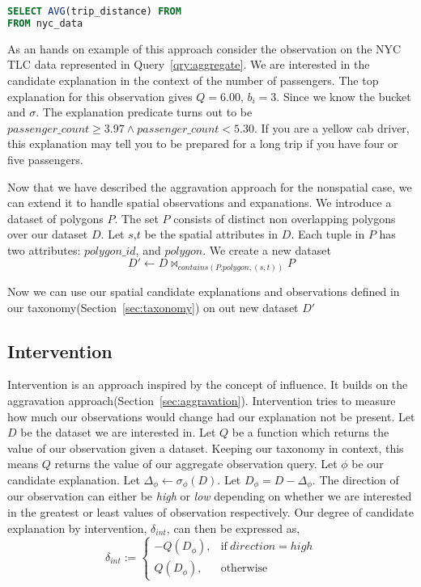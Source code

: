\renewcommand{\lstlistingname}{Query}%
\begin{lstlisting}[language=SQL, caption=Aggregate Query for average tip percentage, label=qry:aggregate]
SELECT AVG(trip_distance) FROM
FROM nyc_data
\end{lstlisting}

As an hands on example of this approach consider the observation on the NYC TLC data represented in Query~\ref{qry:aggregate}. We are interested in the candidate explanation in the context of the number of passengers. The top explanation for this observation gives $Q=6.00$, $b_i=3$. Since we know the bucket and $\sigma$. The explanation predicate turns out to be $passenger\_count \geq 3.97 \wedge passenger\_count < 5.30$. If you are a yellow cab driver, this explanation may tell you to be prepared for a long trip if you have four or five passengers.

Now that we have described the aggravation approach for the nonspatial case, we can extend it to handle spatial observations and expanations. We introduce a dataset of polygons $P$. The set $P$ consists of distinct non overlapping polygons over our dataset $D$. Let $s$,$t$ be the spatial attributes in $D$. Each tuple in $P$ has two attributes: $polygon\_id$, and $polygon$. We create a new dataset 
$$D' \leftarrow D \bowtie_{contains(P.polygon,(s,t))} P$$

Now we can use our spatial candidate explanations and observations defined in our taxonomy(Section~\ref{sec:taxonomy}) on out new dataset $D'$

\subsection{Intervention}
\label{sec:intervention}

Intervention is an approach inspired by the concept of influence. It builds on the aggravation approach(Section~\ref{sec:aggravation}). Intervention tries to measure how much our observations would change had our explanation not be present. Let $D$ be the dataset we are interested in. Let $Q$ be a function which returns the value of our observation given a dataset. Keeping our taxonomy in context, this means $Q$ returns the value of our aggregate observation query. Let $\phi$ be our candidate explanation. Let $\Delta_\phi \leftarrow \sigma_\phi(D)$. Let $D_\phi = D - \Delta_\phi$. The direction of our observation can either be \textit{high} or \textit{low} depending on whether we are interested in the greatest or least values of observation respectively. Our degree of candidate explanation by intervention, $\delta_{int}$, can then be expressed as,
\begin{equation}
\delta_{int}:=
    \begin{cases}
        -Q(D_\phi), & \text{if}\ direction=high \\
        Q(D_\phi), & \text{otherwise}
    \end{cases}
\end{equation}

